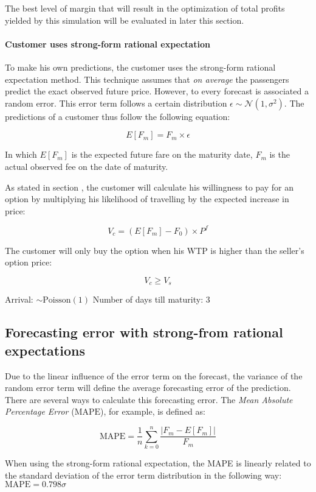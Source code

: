 The best level of margin that will result in the optimization of total profits yielded by this simulation will be evaluated in later this section.


\paragraph{Customer uses strong-form rational expectation}
To make his own predictions, the customer uses the strong-form rational expectation method. This technique assumes that \emph{on average} the passengers predict the exact observed future price. However, to every forecast is associated a random error. This error term follows a certain distribution $\epsilon \sim \mathcal{N}(1, \sigma^2)$. The predictions of a customer thus follow the following equation:

$$ E[F_m] = F_m \times \epsilon $$

In which $E[F_m]$ is the expected future fare on the maturity date, $F_m$ is the actual observed fee on the date of maturity.

As stated in section , the customer will calculate his willingness to pay for an option by multiplying his likelihood of travelling by the expected increase in price:

$$ V_c = (E[F_m] - F_0) \times P^f $$

The customer will only buy the option when his WTP is higher than the seller's option price:

$$ V_c \ge V_s $$


Arrival: $ \sim \mbox{Poisson}(1) $
Number of days till maturity: 3


\subsection{Forecasting error with strong-from rational expectations}
Due to the linear influence of the error term on the forecast, the variance of the random error term will define the average forecasting error of the prediction. There are several ways to calculate this forecasting error. The \emph{Mean Absolute Percentage Error} ($\mbox{MAPE}$), for example, is defined as:

$$ \mbox{MAPE} = \frac{1}{n} \sum\limits_{k=0}^n \frac{|F_m - E[F_m]|}{F_m} $$

When using the strong-form rational expectation, the MAPE is linearly related to the standard deviation of the error term distribution in the following way: $ \mbox{MAPE} = 0.798 \sigma $

